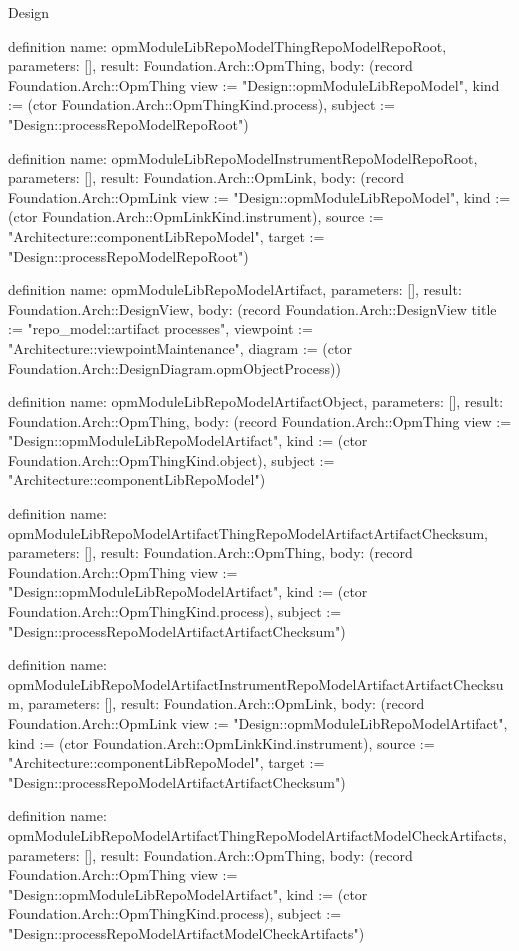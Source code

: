 \begin{lexlean}{Design}
\begin{semanticmodule}
definition{
  name: opmModuleLibRepoModelThingRepoModelRepoRoot,
  parameters: [],
  result: Foundation.Arch::OpmThing,
  body: (record Foundation.Arch::OpmThing {view := "Design::opmModuleLibRepoModel", kind := (ctor Foundation.Arch::OpmThingKind.process), subject := "Design::processRepoModelRepoRoot"})
}

definition{
  name: opmModuleLibRepoModelInstrumentRepoModelRepoRoot,
  parameters: [],
  result: Foundation.Arch::OpmLink,
  body: (record Foundation.Arch::OpmLink {view := "Design::opmModuleLibRepoModel", kind := (ctor Foundation.Arch::OpmLinkKind.instrument), source := "Architecture::componentLibRepoModel", target := "Design::processRepoModelRepoRoot"})
}

definition{
  name: opmModuleLibRepoModelArtifact,
  parameters: [],
  result: Foundation.Arch::DesignView,
  body: (record Foundation.Arch::DesignView {title := "repo_model::artifact processes", viewpoint := "Architecture::viewpointMaintenance", diagram := (ctor Foundation.Arch::DesignDiagram.opmObjectProcess)})
}

definition{
  name: opmModuleLibRepoModelArtifactObject,
  parameters: [],
  result: Foundation.Arch::OpmThing,
  body: (record Foundation.Arch::OpmThing {view := "Design::opmModuleLibRepoModelArtifact", kind := (ctor Foundation.Arch::OpmThingKind.object), subject := "Architecture::componentLibRepoModel"})
}

definition{
  name: opmModuleLibRepoModelArtifactThingRepoModelArtifactArtifactChecksum,
  parameters: [],
  result: Foundation.Arch::OpmThing,
  body: (record Foundation.Arch::OpmThing {view := "Design::opmModuleLibRepoModelArtifact", kind := (ctor Foundation.Arch::OpmThingKind.process), subject := "Design::processRepoModelArtifactArtifactChecksum"})
}

definition{
  name: opmModuleLibRepoModelArtifactInstrumentRepoModelArtifactArtifactChecksum,
  parameters: [],
  result: Foundation.Arch::OpmLink,
  body: (record Foundation.Arch::OpmLink {view := "Design::opmModuleLibRepoModelArtifact", kind := (ctor Foundation.Arch::OpmLinkKind.instrument), source := "Architecture::componentLibRepoModel", target := "Design::processRepoModelArtifactArtifactChecksum"})
}

definition{
  name: opmModuleLibRepoModelArtifactThingRepoModelArtifactModelCheckArtifacts,
  parameters: [],
  result: Foundation.Arch::OpmThing,
  body: (record Foundation.Arch::OpmThing {view := "Design::opmModuleLibRepoModelArtifact", kind := (ctor Foundation.Arch::OpmThingKind.process), subject := "Design::processRepoModelArtifactModelCheckArtifacts"})
}


\end{semanticmodule}
\end{lexlean}
